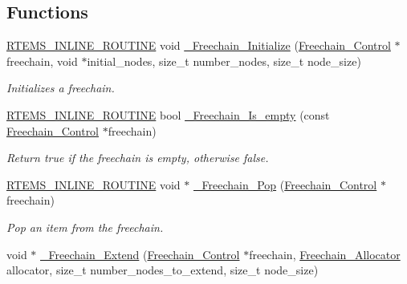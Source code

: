 \subsection*{Functions}
\begin{DoxyCompactItemize}
\item 
\mbox{\hyperlink{group__RTEMSScoreBaseDefs_gac216239df231d5dbd15e3520b0b9313f}{R\+T\+E\+M\+S\+\_\+\+I\+N\+L\+I\+N\+E\+\_\+\+R\+O\+U\+T\+I\+NE}} void \mbox{\hyperlink{group__RTEMSScoreFreechain_gae257ce6dd277d9bfe7af999b1dd3c274}{\+\_\+\+Freechain\+\_\+\+Initialize}} (\mbox{\hyperlink{structFreechain__Control}{Freechain\+\_\+\+Control}} $\ast$freechain, void $\ast$initial\+\_\+nodes, size\+\_\+t number\+\_\+nodes, size\+\_\+t node\+\_\+size)
\begin{DoxyCompactList}\small\item\em Initializes a freechain. \end{DoxyCompactList}\item 
\mbox{\hyperlink{group__RTEMSScoreBaseDefs_gac216239df231d5dbd15e3520b0b9313f}{R\+T\+E\+M\+S\+\_\+\+I\+N\+L\+I\+N\+E\+\_\+\+R\+O\+U\+T\+I\+NE}} bool \mbox{\hyperlink{group__RTEMSScoreFreechain_ga7ced48b316d9b52cf5ef6da70ea8a76d}{\+\_\+\+Freechain\+\_\+\+Is\+\_\+empty}} (const \mbox{\hyperlink{structFreechain__Control}{Freechain\+\_\+\+Control}} $\ast$freechain)
\begin{DoxyCompactList}\small\item\em Return true if the freechain is empty, otherwise false. \end{DoxyCompactList}\item 
\mbox{\hyperlink{group__RTEMSScoreBaseDefs_gac216239df231d5dbd15e3520b0b9313f}{R\+T\+E\+M\+S\+\_\+\+I\+N\+L\+I\+N\+E\+\_\+\+R\+O\+U\+T\+I\+NE}} void $\ast$ \mbox{\hyperlink{group__RTEMSScoreFreechain_gaf04d9f5d6db92a5724f8a2b8dcc85a1d}{\+\_\+\+Freechain\+\_\+\+Pop}} (\mbox{\hyperlink{structFreechain__Control}{Freechain\+\_\+\+Control}} $\ast$freechain)
\begin{DoxyCompactList}\small\item\em Pop an item from the freechain. \end{DoxyCompactList}\item 
void $\ast$ \mbox{\hyperlink{group__RTEMSScoreFreechain_ga6d2f5e4f088a9c17928f2fa925a1d4f6}{\+\_\+\+Freechain\+\_\+\+Extend}} (\mbox{\hyperlink{structFreechain__Control}{Freechain\+\_\+\+Control}} $\ast$freechain, \mbox{\hyperlink{group__RTEMSScoreFreechain_ga1e28d76c4121a3b08517d45eab453ecc}{Freechain\+\_\+\+Allocator}} allocator, size\+\_\+t number\+\_\+nodes\+\_\+to\+\_\+extend, size\+\_\+t node\+\_\+size)

\end{DoxyCompactItemize}
